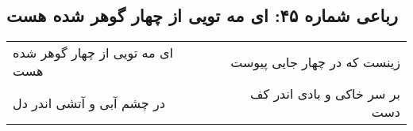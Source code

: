 \begin{center}
\section*{رباعی شماره ۴۵: ای مه تویی از چهار گوهر شده هست}
\label{sec:sh045}
\begin{longtable}{l p{0.5cm} r}
ای مه تویی از چهار گوهر شده هست
&&
زینست که در چهار جایی پیوست
\\
در چشم آبی و آتشی اندر دل
&&
بر سر خاکی و بادی اندر کف دست
\\
\end{longtable}
\end{center}
